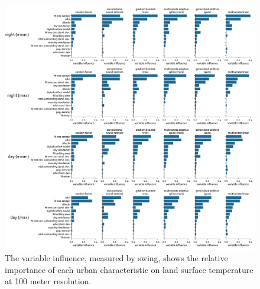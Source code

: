 \documentclass[final,3p,times,twocolumn,sort&compress]{elsarticle}
\begin{document}
\begin{figure}[h]
    \begin{center}
    \includegraphics[width=\linewidth]{fig/report/importance_100.png}
    \caption[Variable influence on LST at 100 meter resolution]{
    The variable influence, measured by swing, shows the relative importance of each urban characteristic on land surface temperature at 100 meter resolution.}
    \label{fig:importance_100}
    \end{center}
\end{figure}
\end{document}
